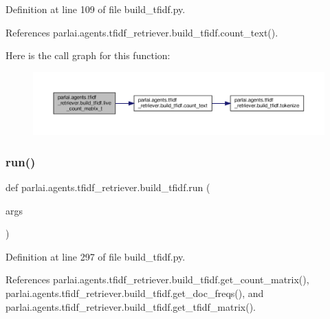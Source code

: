 Definition at line 109 of file build\+\_\+tfidf.\+py.



References parlai.\+agents.\+tfidf\+\_\+retriever.\+build\+\_\+tfidf.\+count\+\_\+text().

Here is the call graph for this function\+:
\nopagebreak
\begin{figure}[H]
\begin{center}
\leavevmode
\includegraphics[width=350pt]{namespaceparlai_1_1agents_1_1tfidf__retriever_1_1build__tfidf_af6a82e7b8a6efb75fb73be53b55a7787_cgraph}
\end{center}
\end{figure}
\mbox{\label{namespaceparlai_1_1agents_1_1tfidf__retriever_1_1build__tfidf_a0d8cca9dbdf0fa23d25e81ec2a96b347}} 
\subsubsection{\texorpdfstring{run()}{run()}}
{\footnotesize\ttfamily def parlai.\+agents.\+tfidf\+\_\+retriever.\+build\+\_\+tfidf.\+run (\begin{DoxyParamCaption}\item[{}]{args }\end{DoxyParamCaption})}



Definition at line 297 of file build\+\_\+tfidf.\+py.



References parlai.\+agents.\+tfidf\+\_\+retriever.\+build\+\_\+tfidf.\+get\+\_\+count\+\_\+matrix(), parlai.\+agents.\+tfidf\+\_\+retriever.\+build\+\_\+tfidf.\+get\+\_\+doc\+\_\+freqs(), and parlai.\+agents.\+tfidf\+\_\+retriever.\+build\+\_\+tfidf.\+get\+\_\+tfidf\+\_\+matrix().

